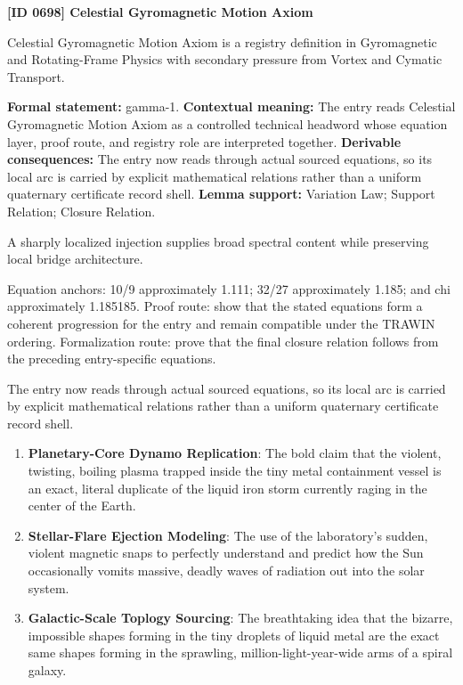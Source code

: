 \clearpage
\noindent\textbf{[ID 0698] Celestial Gyromagnetic Motion Axiom}\par
\vspace{0.35em}
\begingroup\small
{}
Celestial Gyromagnetic Motion Axiom is a registry definition in Gyromagnetic and Rotating-Frame Physics with secondary pressure from Vortex and Cymatic Transport.

\begingroup\footnotesize\setlength{\emergencystretch}{3em}\sloppy
\textbf{Formal statement:} gamma-1. \textbf{Contextual meaning:} The entry reads Celestial Gyromagnetic Motion Axiom as a controlled technical headword whose equation layer, proof route, and registry role are interpreted together. \textbf{Derivable consequences:} The entry now reads through actual sourced equations, so its local arc is carried by explicit mathematical relations rather than a uniform quaternary certificate record shell. \textbf{Lemma support:} Variation Law; Support Relation; Closure Relation.\par
\endgroup

A sharply localized injection supplies broad spectral content while preserving local bridge architecture.

Equation anchors: 10/9 approximately 1.111; 32/27 approximately 1.185; and chi approximately 1.185185. Proof route: show that the stated equations form a coherent progression for the entry and remain compatible under the TRAWIN ordering. Formalization route: prove that the final closure relation follows from the preceding entry-specific equations.

The entry now reads through actual sourced equations, so its local arc is carried by explicit mathematical relations rather than a uniform quaternary certificate record shell.
\endgroup

\begin{enumerate}[leftmargin=1.6em,itemsep=6pt,topsep=4pt]
\item \textbf{Planetary-Core Dynamo Replication}: The bold claim that the violent, twisting, boiling plasma trapped inside the tiny metal containment vessel is an exact, literal duplicate of the liquid iron storm currently raging in the center of the Earth.
\item \textbf{Stellar-Flare Ejection Modeling}: The use of the laboratory's sudden, violent magnetic snaps to perfectly understand and predict how the Sun occasionally vomits massive, deadly waves of radiation out into the solar system.
\item \textbf{Galactic-Scale Toplogy Sourcing}: The breathtaking idea that the bizarre, impossible shapes forming in the tiny droplets of liquid metal are the exact same shapes forming in the sprawling, million-light-year-wide arms of a spiral galaxy.
\end{enumerate}

